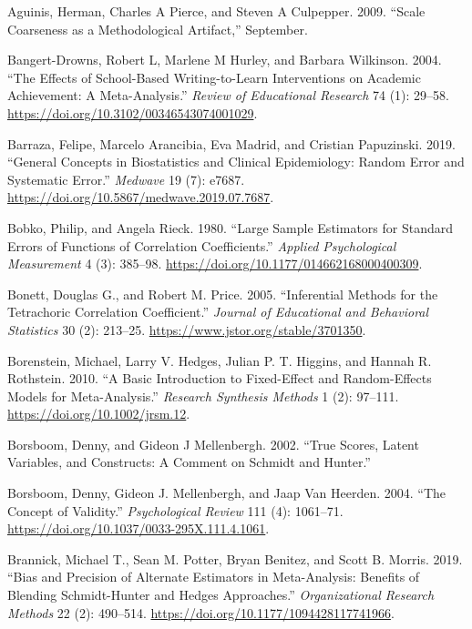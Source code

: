 \documentclass[
  letterpaper,
  DIV=11,
  numbers=noendperiod]{scrreprt}
\newlength{\cslhangindent}
\newenvironment{CSLReferences}[2] %
 {\begin{list}{}{%
  \setlength{\itemindent}{0pt}
  \setlength{\leftmargin}{0pt}
  \setlength{\parsep}{0pt}
  \ifodd #1
   \setlength{\leftmargin}{\cslhangindent}
   \setlength{\itemindent}{-1\cslhangindent}
  \fi
  \setlength{\itemsep}{#2\baselineskip}}}
 {\end{list}}
\begin{document}
\label{refs}
\begin{CSLReferences}{1}{0}
Aguinis, Herman, Charles A Pierce, and Steven A Culpepper. 2009.
{``Scale Coarseness as a Methodological Artifact,''} September.

Bangert-Drowns, Robert L, Marlene M Hurley, and Barbara Wilkinson. 2004.
{``The Effects of School-Based Writing-to-Learn Interventions on
Academic Achievement: A Meta-Analysis.''} \emph{Review of Educational
Research} 74 (1): 29--58.
\url{https://doi.org/10.3102/00346543074001029}.

Barraza, Felipe, Marcelo Arancibia, Eva Madrid, and Cristian Papuzinski.
2019. {``General Concepts in Biostatistics and Clinical Epidemiology:
Random Error and Systematic Error.''} \emph{Medwave} 19 (7): e7687.
\url{https://doi.org/10.5867/medwave.2019.07.7687}.

Bobko, Philip, and Angela Rieck. 1980. {``Large Sample Estimators for
Standard Errors of Functions of Correlation Coefficients.''}
\emph{Applied Psychological Measurement} 4 (3): 385--98.
\url{https://doi.org/10.1177/014662168000400309}.

Bonett, Douglas G., and Robert M. Price. 2005. {``Inferential Methods
for the Tetrachoric Correlation Coefficient.''} \emph{Journal of
Educational and Behavioral Statistics} 30 (2): 213--25.
\url{https://www.jstor.org/stable/3701350}.

Borenstein, Michael, Larry V. Hedges, Julian P. T. Higgins, and Hannah
R. Rothstein. 2010. {``A Basic Introduction to Fixed-Effect and
Random-Effects Models for Meta-Analysis.''} \emph{Research Synthesis
Methods} 1 (2): 97--111. \url{https://doi.org/10.1002/jrsm.12}.

Borsboom, Denny, and Gideon J Mellenbergh. 2002. {``True Scores, Latent
Variables, and Constructs: A Comment on Schmidt and Hunter.''}

Borsboom, Denny, Gideon J. Mellenbergh, and Jaap Van Heerden. 2004.
{``The Concept of Validity.''} \emph{Psychological Review} 111 (4):
1061--71. \url{https://doi.org/10.1037/0033-295X.111.4.1061}.

Brannick, Michael T., Sean M. Potter, Bryan Benitez, and Scott B.
Morris. 2019. {``Bias and Precision of Alternate Estimators in
Meta-Analysis: Benefits of Blending Schmidt-Hunter and Hedges
Approaches.''} \emph{Organizational Research Methods} 22 (2): 490--514.
\url{https://doi.org/10.1177/1094428117741966}.


\end{CSLReferences}
\end{document}
